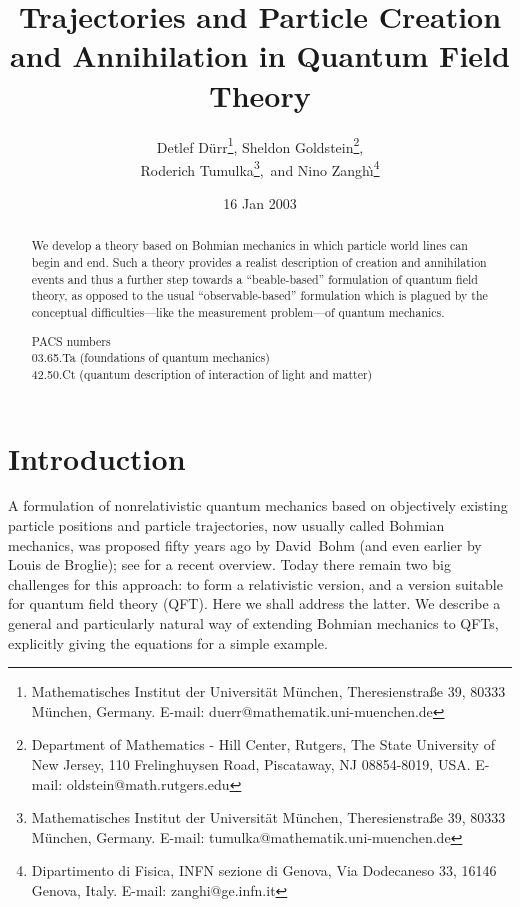 \documentclass[12pt]{article}
\title{Trajectories and  Particle Creation and Annihilation in Quantum
Field Theory}
\author{
Detlef D\"urr\footnote{Mathematisches Institut der Universit\"{a}t 
	M\"{u}nchen, Theresienstra{\ss}e 39, 80333 M\"{u}nchen, Germany. 
	E-mail: duerr@mathematik.uni-muenchen.de},
Sheldon Goldstein\footnote{Department of Mathematics -
	Hill Center, Rutgers, The State University of New Jersey, 
	110 Frelinghuysen Road, Piscataway, NJ 08854-8019, USA.
	E-mail: oldstein@math.rutgers.edu},\\
Roderich Tumulka\footnote{Mathematisches Institut der Universit\"{a}t 
	M\"{u}nchen, Theresienstra{\ss}e 39, 80333 M\"{u}nchen, Germany. 
	E-mail: tumulka@mathematik.uni-muenchen.de},\ and
Nino Zangh\`\i\footnote{Dipartimento di Fisica, INFN sezione di Genova, 
	Via Dodecaneso 33, 16146 Genova, Italy. E-mail: zanghi@ge.infn.it}
}
\date{16 Jan 2003}
\begin{document}
\maketitle
\begin{abstract}
We develop a theory based on Bohmian mechanics in which particle world
lines can begin and end. Such a theory provides a realist description
of creation and annihilation events and thus a further step towards a
``beable-based'' formulation of quantum field theory, as opposed to
the usual ``observable-based'' formulation which is plagued by the
conceptual difficulties---like the measurement problem---of quantum
mechanics.
\bigskip

\noindent PACS numbers \\
	03.65.Ta (foundations of quantum mechanics)\\
	42.50.Ct (quantum description of interaction of light and matter)
\end{abstract}

\newcommand{\RRR}{\mathbb{R}} %
\newcommand{\CCC}{\mathbb{C}}
\newcommand{\SSS}{\mathbb{S}} %
\newcommand{\EEE}{\mathbb{E}}
\newcommand{\NNN}{\mathbb{N}}
\newcommand{\bo}{\mathrm{B}}%
\newcommand{\el}{\mathrm{F}} %
\newcommand{\inter}{\mathrm{int}} %
\newcommand{\profile}{\varphi} %
\newcommand{\hi}{${\cal H}$} %
\newcommand{\LL}{{\cal L}}
\newcommand{\Fock}{{\cal F}} %
\newcommand{\1}{\boldsymbol{1}} %
\newcommand{\vx}{\boldsymbol{x}}
\newcommand{\vk}{\boldsymbol k}
\newcommand{\vu}{\boldsymbol u}
\newcommand{\vy}{\boldsymbol y}
\newcommand{\vX}{\boldsymbol X}
\newcommand{\vY}{\boldsymbol Y}
\renewcommand{\Im}{\,\mathrm{Im}\,}
\renewcommand{\Re}{\,\mathrm{Re}\,}
\newcommand{\Laplace}{\Delta} %
\newcommand{\D}{d} %
\newcommand{\E}{e} %
\newcommand{\I}{\mathrm{i}} %

\newpage

\section{Introduction}

A formulation of nonrelativistic quantum mechanics based on objectively
existing particle positions and particle trajectories, now usually called
Bohmian mechanics, was proposed fifty years ago by David~Bohm (and even
earlier by Louis de Broglie); see \cite{BM1} for a recent overview.  Today
there remain two big challenges for this approach: to form a relativistic
version, and a version suitable for quantum field theory (QFT). Here we
shall address the latter. We describe a general and particularly natural
way of extending Bohmian mechanics to QFTs, explicitly giving the equations
for a simple example.
\end{document}
